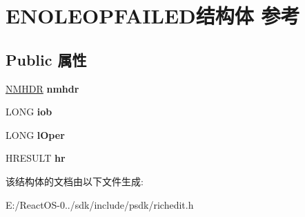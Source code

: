 \hypertarget{struct_e_n_o_l_e_o_p_f_a_i_l_e_d}{}\section{E\+N\+O\+L\+E\+O\+P\+F\+A\+I\+L\+E\+D结构体 参考}
\label{struct_e_n_o_l_e_o_p_f_a_i_l_e_d}
\subsection*{Public 属性}
\begin{DoxyCompactItemize}
\item 
\mbox{\label{struct_e_n_o_l_e_o_p_f_a_i_l_e_d_acd0f69090b80140d388336f54f851569}} 
\hyperlink{structtag_n_m_h_d_r}{N\+M\+H\+DR} {\bfseries nmhdr}
\item 
\mbox{\label{struct_e_n_o_l_e_o_p_f_a_i_l_e_d_a045be6c725de8e1162ecbea5f021f342}} 
L\+O\+NG {\bfseries iob}
\item 
\mbox{\label{struct_e_n_o_l_e_o_p_f_a_i_l_e_d_a95b24100cdf908a2b774122cf682e51a}} 
L\+O\+NG {\bfseries l\+Oper}
\item 
\mbox{\label{struct_e_n_o_l_e_o_p_f_a_i_l_e_d_a0aa6da08122a63d7df76418b52785176}} 
H\+R\+E\+S\+U\+LT {\bfseries hr}
\end{DoxyCompactItemize}


该结构体的文档由以下文件生成\+:\begin{DoxyCompactItemize}
\item 
E\+:/\+React\+O\+S-\/0../sdk/include/psdk/richedit.\+h\end{DoxyCompactItemize}
